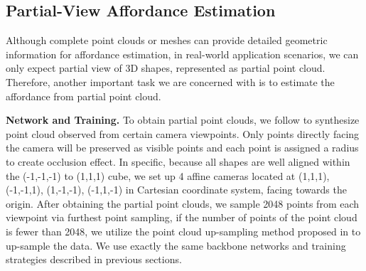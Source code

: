 \documentclass[final]{cvpr}
\begin{document}
\begin{table}[!htb]
\caption{The performances of two different networks on full-shape affordance estimation task over train, validate and test sets. P represents PointNet++ and D refers to DGCNN.}
\label{Set_Performances}
\end{table}

\subsection{Partial-View Affordance Estimation} \label{partial task}

Although complete point clouds or meshes can provide detailed geometric information for affordance estimation, in real-world application scenarios, we can only expect partial view of 3D shapes, represented as partial point cloud. Therefore, another important task we are concerned with is to estimate the affordance from partial point cloud.

\noindent\textbf{Network and Training.} To obtain partial point clouds, we follow \cite{katz2007direct} to synthesize point cloud observed from certain camera viewpoints. Only points directly facing the camera will be preserved as visible points and each point is assigned a radius to create occlusion effect. In specific, because all shapes are well aligned within the (-1,-1,-1) to (1,1,1) cube, we set up 4 affine cameras located at (1,1,1), (-1,-1,1), (1,-1,-1), (-1,1,-1) in Cartesian coordinate system, facing towards the origin. After obtaining the partial point clouds, we sample 2048 points from each viewpoint via furthest point sampling, if the number of points of the point cloud is fewer than 2048, we utilize the point cloud up-sampling method proposed in \cite{Yifan_2019_CVPR} to up-sample the data. We use exactly the same backbone networks and training strategies described in previous sections.
\end{document}
